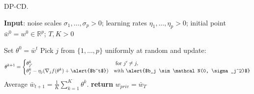 \documentclass{beamer}
\begin{document}
\begin{frame}
  \begin{algorithm}[H]
    \caption{DP-CD.}
    \label{algo:dp-cd}
    \textbf{Input}:
    noise scales $\sigma_1,\dots,\sigma_p > 0$;
    learning rates $\eta_1,\dots,\eta_p > 0$;
    initial point $\bar w^0 = w^0 \in \mathbb{R}^p$;
    $T, K > 0$
    \begin{algorithmic}
      \State Set $\theta^0 = \bar w^t$
      \State Pick $j$ from $\{1, \dots, p\}$ uniformly at random and update:
      \State%
      \vspace{-1em}
      \begin{align*}
        \theta^{k+1} =
        \begin{cases}
          \theta_{j'}^{k} & \text{ for } j' \neq j, \\
          \theta_{j}^{k} - \eta_j (\nabla_j f(\theta^k) + \text{\alert{$b^t$}})
          & \text{with \alert{$b_j \sim \mathcal N(0, \sigma_j^2)$}}
        \end{cases}
      \end{align*}
      \EndFor
      \State Average $\bar w_{t+1} = \frac 1K \sum_{k=1}^K \theta^k$.
      \EndFor
      \State \textbf{return} $ w_{priv} = \bar w_T$
    \end{algorithmic}
  \end{algorithm}
\end{frame}
\end{document}
